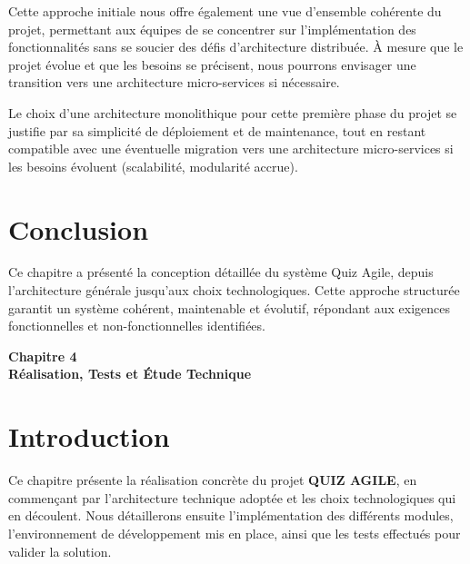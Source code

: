 \documentclass[12pt,a4paper]{report}
\begin{document}
Cette approche initiale nous offre également une vue d'ensemble cohérente du projet, permettant aux équipes de se concentrer sur l'implémentation des fonctionnalités sans se soucier des défis d'architecture distribuée. À mesure que le projet évolue et que les besoins se précisent, nous pourrons envisager une transition vers une architecture micro-services si nécessaire.

Le choix d'une architecture monolithique pour cette première phase du projet se justifie par sa simplicité de déploiement et de maintenance, tout en restant compatible avec une éventuelle migration vers une architecture micro-services si les besoins évoluent (scalabilité, modularité accrue).

\section{Conclusion}

Ce chapitre a présenté la conception détaillée du système Quiz Agile, depuis l'architecture générale jusqu'aux choix technologiques. Cette approche structurée garantit un système cohérent, maintenable et évolutif, répondant aux exigences fonctionnelles et non-fonctionnelles identifiées.


\cleardoublepage
\thispagestyle{empty}
\begin{center}
    \vspace*{4cm}
    {\Huge \textbf{Chapitre 4}}\\[1.5cm]
    {\LARGE \textbf{Réalisation, Tests et Étude Technique}}
\end{center}
\cleardoublepage

\setcounter{section}{0}

\section{Introduction}

Ce chapitre présente la réalisation concrète du projet \textbf{QUIZ AGILE}, en commençant par l'architecture technique adoptée et les choix technologiques qui en découlent. Nous détaillerons ensuite l'implémentation des différents modules, l'environnement de développement mis en place, ainsi que les tests effectués pour valider la solution.
\end{document}

